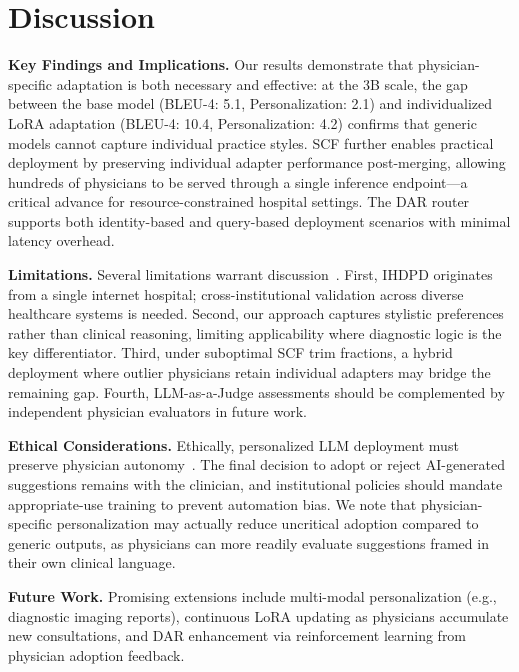 ﻿\section*{Discussion}

\textbf{Key Findings and Implications.} Our results demonstrate that physician-specific adaptation is both necessary and effective: at the 3B scale, the gap between the base model (BLEU-4: 5.1, Personalization: 2.1) and individualized LoRA adaptation (BLEU-4: 10.4, Personalization: 4.2) confirms that generic models cannot capture individual practice styles. SCF further enables practical deployment by preserving individual adapter performance post-merging, allowing hundreds of physicians to be served through a single inference endpoint---a critical advance for resource-constrained hospital settings. The DAR router supports both identity-based and query-based deployment scenarios with minimal latency overhead.


\textbf{Limitations.} Several limitations warrant discussion~\cite{crossBiasMedicalAI2024Nian11Yue7Ri}. First, IHDPD originates from a single internet hospital; cross-institutional validation across diverse healthcare systems is needed. Second, our approach captures stylistic preferences rather than clinical reasoning, limiting applicability where diagnostic logic is the key differentiator. Third, under suboptimal SCF trim fractions, a hybrid deployment where outlier physicians retain individual adapters may bridge the remaining gap. Fourth, LLM-as-a-Judge assessments should be complemented by independent physician evaluators in future work.


\textbf{Ethical Considerations.} Ethically, personalized LLM deployment must preserve physician autonomy~\cite{zhangEthicsGovernanceTrustworthy2023}. The final decision to adopt or reject AI-generated suggestions remains with the clinician, and institutional policies should mandate appropriate-use training to prevent automation bias. We note that physician-specific personalization may actually reduce uncritical adoption compared to generic outputs, as physicians can more readily evaluate suggestions framed in their own clinical language. 

\textbf{Future Work.} Promising extensions include multi-modal personalization (e.g., diagnostic imaging reports), continuous LoRA updating as physicians accumulate new consultations, and DAR enhancement via reinforcement learning from physician adoption feedback.



